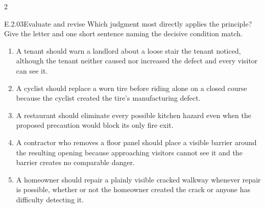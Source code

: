 \documentclass[9pt]{extarticle}
\newcommand{\choice}[1]{\item #1}
\begin{document}
\begin{multicols}{2}
\begin{DenseCoreProblem}{E.2.03}{Evaluate and revise}
Which judgment most directly applies the principle? Give the letter and one short sentence naming the decisive condition match.
\begin{enumerate}[label=(\alph*)]
  \choice{A tenant should warn a landlord about a loose stair the tenant noticed, although the tenant neither caused nor increased the defect and every visitor can see it.}
  \choice{A cyclist should replace a worn tire before riding alone on a closed course because the cyclist created the tire's manufacturing defect.}
  \choice{A restaurant should eliminate every possible kitchen hazard even when the proposed precaution would block its only fire exit.}
  \choice{A contractor who removes a floor panel should place a visible barrier around the resulting opening because approaching visitors cannot see it and the barrier creates no comparable danger.}
  \choice{A homeowner should repair a plainly visible cracked walkway whenever repair is possible, whether or not the homeowner created the crack or anyone has difficulty detecting it.}
\end{enumerate}
\end{DenseCoreProblem}
\end{multicols}
\CoreWorkArea
\FormBreak
{}
\end{document}
